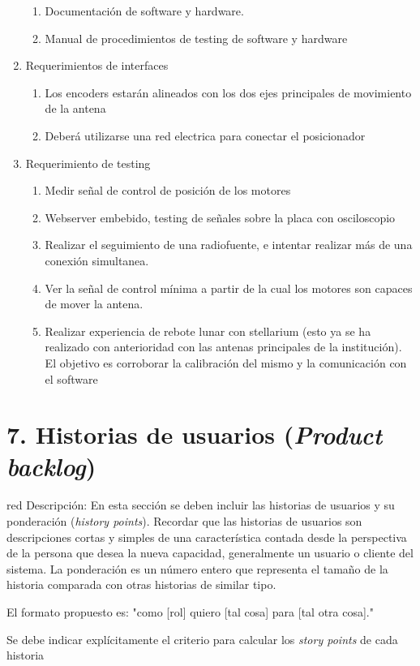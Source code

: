 \documentclass[11pt, %
codirector, %
]{charter}
\begin{document}
\begin{enumerate}
\begin{enumerate}
			\item Documentación de software y hardware. 
			\item Manual de procedimientos de testing de software y hardware	
	\end{enumerate}
	\item Requerimientos de interfaces
		\begin{enumerate}
			\item Los encoders estarán alineados con los dos ejes principales de movimiento de la antena 
			\item Deberá utilizarse una red electrica para conectar el posicionador
		\end{enumerate}
	\item Requerimiento de testing
		\begin{enumerate}
			\item Medir señal de control de posición de los motores
			\item Webserver embebido, testing de señales sobre la placa con osciloscopio
			\item Realizar el seguimiento de una radiofuente, e intentar realizar más de una conexión simultanea. 
			\item Ver la señal de control mínima a partir de la cual los motores son capaces de mover la antena. 
			\item Realizar experiencia de rebote lunar con stellarium (esto ya se ha realizado con anterioridad con las antenas principales de la institución). El objetivo es corroborar la calibración del mismo y la comunicación con el software  

		\end{enumerate}
\end{enumerate}

\section{7. Historias de usuarios (\textit{Product backlog})}
\label{sec:backlog}

\begin{consigna}{red}
Descripción: En esta sección se deben incluir las historias de usuarios y su ponderación (\textit{history points}). Recordar que las historias de usuarios son descripciones cortas y simples de una característica contada desde la perspectiva de la persona que desea la nueva capacidad, generalmente un usuario o cliente del sistema. La ponderación es un número entero que representa el tamaño de la historia comparada con otras historias de similar tipo.

El formato propuesto es: "como [rol] quiero [tal cosa] para [tal otra cosa]."

Se debe indicar explícitamente el criterio para calcular los \textit{story points} de cada historia
\end{consigna}
\end{document}
